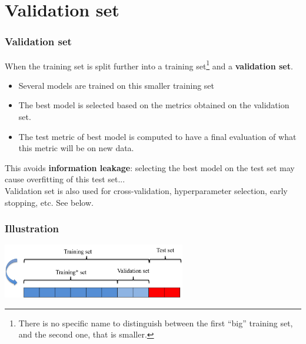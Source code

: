 \section{Validation set}
\begin{frame}
\frametitle{Validation set}
When the training set is split further into a training set\footnote{There is no specific name to distinguish between the first ``big'' training set, and the second one, that is smaller.} and a {\bf validation set}.
\begin{itemize}
\item Several models are trained on this smaller training set
\item The best model is selected based on the metrics obtained on the validation set.
\item The test metric of best model is computed to have a final evaluation of what this metric will be on new data.
\end{itemize}
This avoids {\bf information leakage}: selecting the best model on the test set may cause overfitting of this test set...\\
\vspace{0.3cm}
Validation set is also used for cross-validation, hyperparameter selection, early stopping, etc. See below.
\end{frame}
\begin{frame}
\frametitle{Illustration}
\begin{center}
\includegraphics[width=8cm]{../Graphs/Validation_set.png}
\end{center}
\end{frame}
